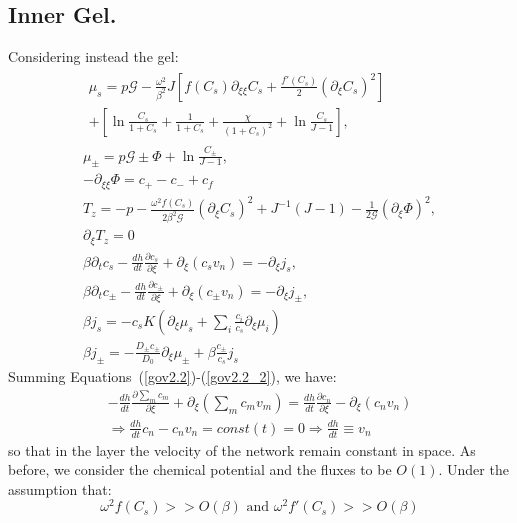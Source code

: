 \documentclass[12pt]{extarticle}
\begin{document}
\subsection{Inner Gel.}
Considering instead the gel:
\begin{gather}
\begin{aligned}
\mu_s = p \mathcal{G} - \frac{\omega^2}{\beta^2} J \left[f(C_s)\partial_{\xi\xi} C_s+\frac{f'(C_s)}{2}\left(\partial_\xi C_s\right)^2\right]\\
+ \left[\ln \frac{C_s}{1+C_s} + \frac{1}{1+C_s}+\frac{\chi}{(1+C_s)^2} + \ln \frac{C_s}{J-1} \right], 
\end{aligned}\label{mus2.2}\\[2.5mm]
\mu_\pm = p \mathcal{G} \pm \Phi  + \ln \frac{C_\pm}{J-1} ,\\
-\partial_{\xi\xi} \Phi = c_+-c_-+c_f\,\label{Poi2.2} \\
T_z= -p-\frac{\omega^2 f(C_s)}{2\beta^2\mathcal{G}} (\partial_\xi C_s)^2+ J^{-1}\left(J-1\right)-\frac{1}{2\mathcal{G}} (\partial_\xi \Phi)^2,\label{T2.2}\\
\partial_\xi T_z=0\\
\beta \partial_t c_s -\frac{dh}{dt}\frac{\partial c_s}{\partial \xi}+\partial_\xi (c_s v_n)= - \partial_\xi j_s,\label{gov2.2}\\
\beta \partial_t c_\pm -\frac{dh}{dt}\frac{\partial c_\pm}{\partial \xi}+\partial_\xi (c_\pm v_n)= -\partial_\xi j_\pm,\label{gov2.2_2}\\
\beta j_s =-c_s K  \left(\partial_\xi\mu_s +\sum_i \frac{c_i}{c_s} \partial_\xi \mu_i\right)\\
\beta j_\pm= - \frac{D_\pm c_\pm}{D_0}\partial_\xi \mu_\pm + \beta \frac{c_\pm}{c_s}j_s
\end{gather}
Summing Equations~(\ref{gov2.2})-(\ref{gov2.2_2}), we have:
\begin{equation}
\begin{aligned}
-\frac{dh}{dt}\frac{\partial \sum_m c_m}{\partial \xi}+ \partial_\xi \left(\sum_m c_m v_m\right)= \frac{dh}{dt}\frac{\partial c_n}{\partial \xi}-\partial_\xi (c_n v_n)\\
\Rightarrow  \frac{dh}{dt} c_n -c_n v_n=const(t)=0 \Rightarrow  \frac{dh}{dt} \equiv v_n
\end{aligned}
\end{equation}
so that in the layer the velocity of the network remain constant in space.
\color{red}
As before, we consider the chemical potential and the fluxes to be $O(1)$. Under the assumption that:
\begin{equation}
\omega^2 f(C_s)>> O(\beta) \text{ and } \omega^2 f'(C_s)>> O(\beta)
\end{equation}
\end{document}
